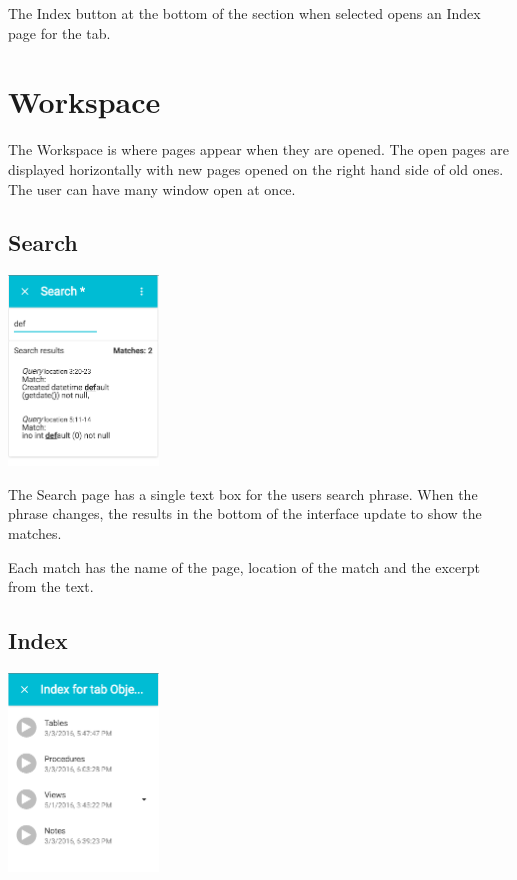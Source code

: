   The Index button at the bottom of the section when selected opens an Index page
  for the tab.

\section{Workspace}


  The Workspace is where pages appear when they are opened. The open pages are displayed
  horizontally with new pages opened on the right hand side of old ones. The user can have
  many window open at once.
\subsection{Search}

  \begin{center}
  \includegraphics[width=0.3\textwidth]{Figures/Pages-Search.png}
  \end{center}

  The Search page has a single text box for the users search phrase. When the phrase 
  changes, the results in the bottom of the interface update to show the matches.

  Each match has the name of the page, location of the match and the excerpt from 
  the text.

\subsection{Index}

  \begin{center}
  \includegraphics[width=0.3\textwidth]{Figures/Pages-Index.png}
  \end{center}

